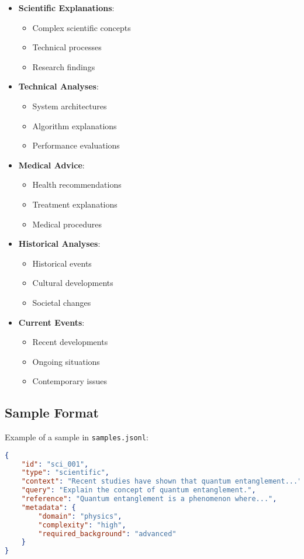 \begin{itemize}
    \item \textbf{Scientific Explanations}:
    \begin{itemize}
        \item Complex scientific concepts
        \item Technical processes
        \item Research findings
    \end{itemize}
    
    \item \textbf{Technical Analyses}:
    \begin{itemize}
        \item System architectures
        \item Algorithm explanations
        \item Performance evaluations
    \end{itemize}
    
    \item \textbf{Medical Advice}:
    \begin{itemize}
        \item Health recommendations
        \item Treatment explanations
        \item Medical procedures
    \end{itemize}
    
    \item \textbf{Historical Analyses}:
    \begin{itemize}
        \item Historical events
        \item Cultural developments
        \item Societal changes
    \end{itemize}
    
    \item \textbf{Current Events}:
    \begin{itemize}
        \item Recent developments
        \item Ongoing situations
        \item Contemporary issues
    \end{itemize}
\end{itemize}

\subsection{Sample Format}
Example of a sample in \texttt{samples.jsonl}:
\begin{lstlisting}[language=JSON, breaklines=true, basicstyle=\ttfamily\scriptsize]
{
    "id": "sci_001",
    "type": "scientific",
    "context": "Recent studies have shown that quantum entanglement...",
    "query": "Explain the concept of quantum entanglement.",
    "reference": "Quantum entanglement is a phenomenon where...",
    "metadata": {
        "domain": "physics",
        "complexity": "high",
        "required_background": "advanced"
    }
}
\end{lstlisting}

